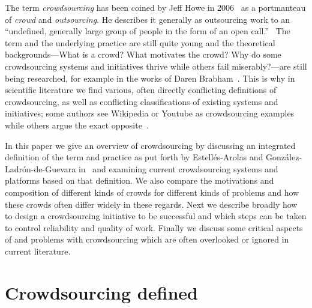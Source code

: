 \documentclass{sig-alternate}
\begin{document}
The term \emph{crowdsourcing} has been coined by Jeff Howe in
2006~\cite{howe2006rise} as a portmanteau of \emph{crowd} and
\emph{outsourcing}. He describes it generally as outsourcing work to an
``undefined, generally large group of people in the form of an open
call.''~\cite{howe2009crowdsourcing} The term and the underlying practice are
still quite young and the theoretical backgrounds---What is a crowd? What
motivates the crowd? Why do some crowdsourcing systems and initiatives thrive
while others fail miserably?---are still being researched, for example in the
works of Daren Brabham~\cite{brabham2008crowdsourcing, brabham2008moving,
	brabham2010moving}. This is why in scientific literature we find various,
often directly conflicting definitions of crowdsourcing, as well as conflicting
classifications of existing systems and initiatives; some authors see Wikipedia
or Youtube as crowdsourcing examples while others argue the exact
opposite~\cite{estelles2012towards}.

In this paper we give an overview of crowdsourcing by discussing an integrated
definition of the term and practice as put forth by Estell{\'e}s-Arolas and
Gonz{\'a}lez-Ladr{\'o}n-de-Guevara in~\cite{estelles2012towards} and examining
current crowdsourcing systems and platforms based on that definition. We also
compare the motivations and composition of different kinds of crowds for
different kinds of problems and how these crowds often differ widely in these
regards. Next we describe broadly how to design a crowdsourcing initiative to be
successful and which steps can be taken to control reliability and quality of
work. Finally we discuss some critical aspects of and problems with
crowdsourcing which are often overlooked or ignored in current literature. 


\section{Crowdsourcing defined}\label{csdef}
\end{document}
